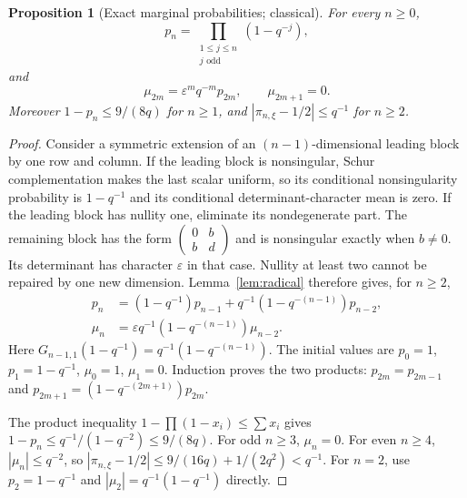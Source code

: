 \documentclass[11pt,a4paper]{article}
\newtheorem{proposition}[theorem]{Proposition}
\theoremstyle{definition}
\theoremstyle{remark}
\newcommand{\eps}{\varepsilon}
\begin{document}
\begin{proposition}[Exact marginal probabilities; classical]\label{prop:marginals}
For every $n\ge0$,
\begin{equation}\label{eq:p-product}
 p_n=\prod_{\substack{1\le j\le n\\j\text{ odd}}}(1-q^{-j}),
\end{equation}
and
\begin{equation}\label{eq:mu-product}
 \mu_{2m}=\eps^m q^{-m}p_{2m},\qquad \mu_{2m+1}=0.
\end{equation}
Moreover $1-p_n\le 9/(8q)$ for $n\ge1$, and
$|\pi_{n,\xi}-1/2|\le q^{-1}$ for $n\ge2$.
\end{proposition}
\begin{proof}
Consider a symmetric extension of an $(n-1)$-dimensional leading block by
one row and column. If the leading block is nonsingular, Schur complementation
makes the last scalar uniform, so its conditional nonsingularity probability
is $1-q^{-1}$ and its conditional determinant-character mean is zero.
If the leading block has nullity one, eliminate its nondegenerate part.
The remaining block has the form
$\left(\begin{smallmatrix}0&b\\b&d\end{smallmatrix}\right)$ and is nonsingular
exactly when $b\ne0$. Its determinant has character $\eps$ in that case.
Nullity at least two cannot be repaired by one new dimension. Lemma~\ref{lem:radical}
therefore gives, for $n\ge2$,
\begin{align}
 p_n&=(1-q^{-1})p_{n-1}
       +q^{-1}(1-q^{-(n-1)})p_{n-2},\label{eq:p-recursion}\\
 \mu_n&=\eps q^{-1}(1-q^{-(n-1)})\mu_{n-2}.
 \label{eq:mu-recursion}
\end{align}
Here $G_{n-1,1}(1-q^{-1})=q^{-1}(1-q^{-(n-1)})$.
The initial values are $p_0=1$, $p_1=1-q^{-1}$, $\mu_0=1$, $\mu_1=0$.
Induction proves the two products: $p_{2m}=p_{2m-1}$ and
$p_{2m+1}=(1-q^{-(2m+1)})p_{2m}$.

The product inequality $1-\prod(1-x_i)\le\sum x_i$ gives
$1-p_n\le q^{-1}/(1-q^{-2})\le9/(8q)$.
For odd $n\ge3$, $\mu_n=0$. For even $n\ge4$,
$|\mu_n|\le q^{-2}$, so
$|\pi_{n,\xi}-1/2|\le9/(16q)+1/(2q^2)<q^{-1}$.
For $n=2$, use $p_2=1-q^{-1}$ and
$|\mu_2|=q^{-1}(1-q^{-1})$ directly.
\end{proof}
\end{document}
